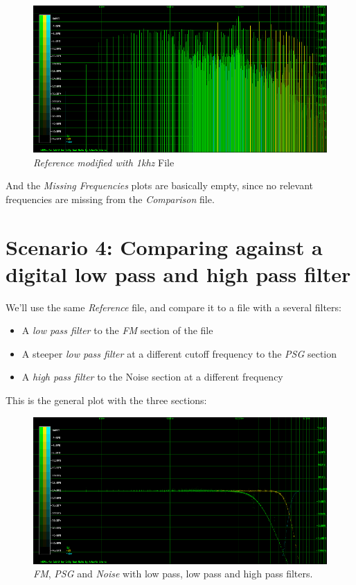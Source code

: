 \documentclass[10pt,a4paper]{report}
\begin{document}
\begin{figure}[H]
	\centering
	\includegraphics[width=1.0\linewidth]{plots/Plot3-Spectrogram-1khz.png}
	\caption[Reference File]{\textit{Reference modified with 1khz} File}
	\label{fig:plot3-spectrogram-1khz}
\end{figure}


And the \textit{Missing Frequencies} plots are basically empty, since no relevant frequencies are missing from the \textit{Comparison} file.

\section{Scenario 4: Comparing against a digital low pass and high pass filter}

We'll use the same \textit{Reference} file, and compare it to a file with a several filters:

\begin{itemize}
	\item A \textit{low pass filter} to the \textit{FM} section of the file
	\item A steeper \textit{low pass filter} at a different cutoff frequency to the \textit{PSG} section
	\item A \textit{high pass filter} to the Noise section at a different frequency
\end{itemize}

This is the general plot with the three sections:

\begin{figure}[H]
	\centering
	\includegraphics[width=1.0\linewidth]{plots/Plot4-1-All.png}
	\caption[All Plotted]{\textit{FM}, \textit{PSG} and \textit{Noise} with low pass, low pass and high pass filters.}
	\label{fig:plot4-1-all}
\end{figure}
\end{document}
